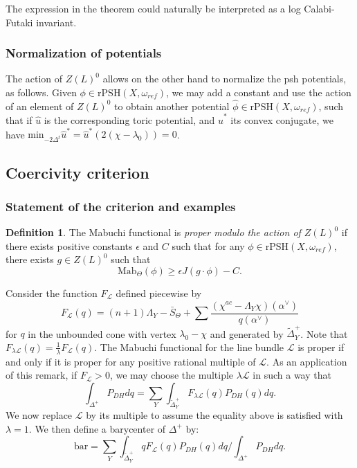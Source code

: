 \documentclass{amsart}
\theoremstyle{definition}
\newtheorem{defn}[thm]{Definition}
\begin{document}
The expression in the theorem could naturally be interpreted as a 
log Calabi-Futaki invariant.

\subsubsection{Normalization of potentials}
\label{subsec_normalize}

The action of $Z(L)^0$ allows on the other hand to normalize the 
psh potentials, as follows. 
Given $\phi \in \mathrm{rPSH}(X,\omega_{ref})$, we may add a constant 
and use the action of an element of $Z(L)^0$ to obtain another 
potential $\hat{\phi} \in \mathrm{rPSH}(X,\omega_{ref})$, such that 
if $\hat{u}$ is the corresponding toric potential, and 
$\hat{u}^*$ its convex conjugate, we have  
$\mathrm{min}_{-2\Delta^t}\hat{u}^*=\hat{u}^*(2(\chi-\lambda_0))=0$.


\subsection{Coercivity criterion}

\subsubsection{Statement of the criterion and examples}

\begin{defn}
The Mabuchi functional is \emph{proper modulo the 
action of $Z(L)^0$} if there exists positive constants $\epsilon$ 
and $C$ such that 
for any $\phi\in \mathrm{rPSH}(X,\omega_{ref})$, 
there exists $g\in Z(L)^0$ such that 
\[
\mathrm{Mab}_{\Theta}(\phi)\geq \epsilon J(g\cdot \phi)-C.
\]
\end{defn}

Consider the function $F_{\mathcal{L}}$ defined piecewise by 
\[
F_{\mathcal{L}}(q)=(n+1)\Lambda_Y-\bar{S}_{\Theta}
+\sum\frac{(\chi^{ac}-\Lambda_Y\chi)(\alpha^{\vee})}{q(\alpha^{\vee})}
\]
for $q$ in the unbounded cone with vertex $\lambda_0-\chi$ and generated by 
$\tilde{\Delta}_Y^+$. 
Note that 
$F_{\lambda\mathcal{L}}(q)=\frac{1}{\lambda}F_{\mathcal{L}}(q)$.
The Mabuchi functional for the line bundle $\mathcal{L}$ 
is proper if and only if it is proper for any positive rational multiple of 
$\mathcal{L}$. As an application of this remark, if $F_{\mathcal{L}}>0$, 
we may choose the multiple 
$\lambda \mathcal{L}$ in such a way that 
\[
\int_{\Delta^+}P_{DH}dq = 
\sum_Y \int_{\tilde{\Delta}_Y^+} F_{\lambda\mathcal{L}}(q)
P_{DH}(q)dq.
\]
We now replace $\mathcal{L}$ by its multiple to assume the equality above is 
satisfied with $\lambda=1$.
We then define a barycenter of $\Delta^+$ by: 
\[
\mathrm{bar} = \sum_Y \int_{\tilde{\Delta}_Y^+} q F_{\mathcal{L}}(q)
P_{DH}(q)dq /\int_{\Delta^+}P_{DH}dq.
\]
\end{document}
